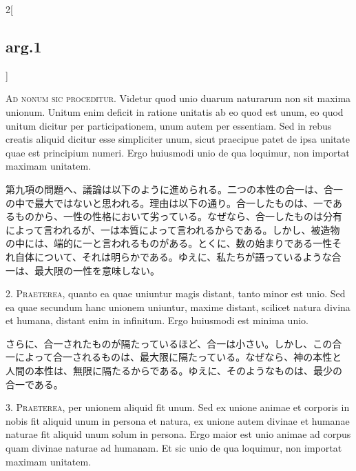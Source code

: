 \documentclass[paper=a4paper,fontsize=10pt,jafontsize=9pt,titlepage]{jlreq}
\begin{document}
\begin{paracol}{2}[\subsection{arg.1}]

{\Huge A}{\scshape d nonum sic proceditur}. Videtur quod unio duarum
naturarum non sit maxima unionum. Unitum enim deficit in ratione
unitatis ab eo quod est unum, eo quod unitum dicitur per
participationem, unum autem per essentiam. Sed in rebus creatis
aliquid dicitur esse simpliciter unum, sicut praecipue patet de ipsa
unitate quae est principium numeri. Ergo huiusmodi unio de qua
loquimur, non importat maximam unitatem.

\switchcolumn

第九項の問題へ、議論は以下のように進められる。二つの本性の合一は、合一
の中で最大ではないと思われる。理由は以下の通り。合一したものは、一であ
るものから、一性の性格において劣っている。なぜなら、合一したものは分有
によって言われるが、一は本質によって言われるからである。しかし、被造物
の中には、端的に一と言われるものがある。とくに、数の始まりである一性そ
れ自体について、それは明らかである。ゆえに、私たちが語っているような合
一は、最大限の一性を意味しない。


2. {\scshape Praeterea}, quanto ea quae uniuntur magis distant, tanto
minor est unio. Sed ea quae secundum hanc unionem uniuntur, maxime
distant, scilicet natura divina et humana, distant enim in
infinitum. Ergo huiusmodi est minima unio.

\switchcolumn

さらに、合一されたものが隔たっているほど、合一は小さい。しかし、この合
一によって合一されるものは、最大限に隔たっている。なぜなら、神の本性と
人間の本性は、無限に隔たるからである。ゆえに、そのようなものは、最少の
合一である。


3. {\scshape Praeterea}, per unionem aliquid fit unum. Sed ex unione
animae et corporis in nobis fit aliquid unum in persona et natura, ex
unione autem divinae et humanae naturae fit aliquid unum solum in
persona. Ergo maior est unio animae ad corpus quam divinae naturae ad
humanam. Et sic unio de qua loquimur, non importat maximam unitatem.


\end{paracol}
\end{document}
